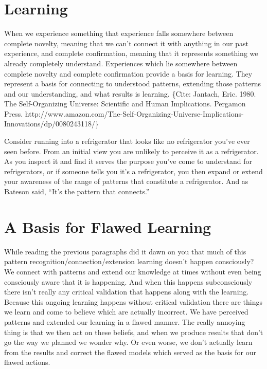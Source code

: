 \documentclass[]{memoir}
\begin{document}
\section{Learning}

When we experience something that experience falls somewhere between
complete novelty, meaning that we can't connect it with anything in our
past experience, and complete confirmation, meaning that it represents
something we already completely understand. Experiences which lie
somewhere between complete novelty and complete confirmation provide a
basis for learning. They represent a basis for connecting to understood
patterns, extending those patterns and our understanding, and what
results is learning. \{Cite: Jantach, Eric. 1980. The Self-Organizing
Universe: Scientific and Human Implications. Pergamon Press.
http://www.amazon.com/The-Self-Organizing-Universe-Implications-Innovations/dp/0080243118/\}

Consider running into a refrigerator that looks like no refrigerator
you've ever seen before. From an initial view you are unlikely to
perceive it as a refrigerator. As you inspect it and find it serves the
purpose you've come to understand for refrigerators, or if someone tells
you it's a refrigerator, you then expand or extend your awareness of the
range of patterns that constitute a refrigerator. And as Bateson said,
``It's the pattern that connects.''

\section{A Basis for Flawed Learning}

While reading the previous paragraphs did it dawn on you that much of
this pattern recognition/connection/extension learning doesn't happen
consciously? We connect with patterns and extend our knowledge at times
without even being consciously aware that it is happening. And when this
happens subconsciously there isn't really any critical validation that
happens along with the learning. Because this ongoing learning happens
without critical validation there are things we learn and come to
believe which are actually incorrect. We have perceived patterns and
extended our learning in a flawed manner. The really annoying thing is
that we then act on these beliefs, and when we produce results that
don't go the way we planned we wonder why. Or even worse, we don't
actually learn from the results and correct the flawed models which
served as the basis for our flawed actions.
\end{document}
